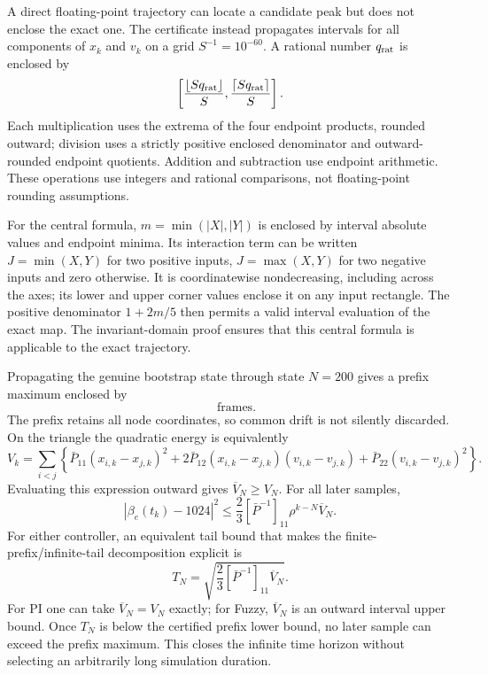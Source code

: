 A direct floating-point trajectory can locate a candidate peak but does
not enclose the exact one. The certificate instead propagates intervals
for all components of $x_k$ and $v_k$ on a grid $S^{-1}=10^{-60}$.
A rational number $q_{\rm rat}$ is enclosed by
\[
 \left[\frac{\lfloor Sq_{\rm rat}\rfloor}{S},\frac{\lceil Sq_{\rm rat}\rceil}{S}\right].
\]
Each multiplication uses the extrema of the four endpoint products,
rounded outward; division uses a strictly positive enclosed denominator
and outward-rounded endpoint quotients. Addition and subtraction use
endpoint arithmetic. These operations use integers and rational comparisons,
not floating-point rounding assumptions.

For the central formula, $m=\min(|X|,|Y|)$ is enclosed by interval
absolute values and endpoint minima. Its interaction term can be written
$J=\min(X,Y)$ for two positive inputs, $J=\max(X,Y)$ for two negative
inputs and zero otherwise. It is coordinatewise nondecreasing, including
across the axes; its lower and upper corner values enclose it on any
input rectangle. The positive denominator $1+2m/5$ then permits a valid
interval evaluation of the exact map. The invariant-domain proof ensures
that this central formula is applicable to the exact trajectory.

Propagating the genuine bootstrap state through state $N=200$ gives a
prefix maximum enclosed by
\begin{equation}
 [17.314056817962,\;17.314056817963]\quad\text{frames}.
 \label{eq:btd_d_fuzzy_prefix}
\end{equation}
The prefix retains all node coordinates, so common drift is not silently
discarded. On the triangle the quadratic energy is equivalently
\begin{equation}
 V_k=\sum_{i<j}\left\{
 \bar P_{11}(x_{i,k}-x_{j,k})^2+
 2\bar P_{12}(x_{i,k}-x_{j,k})(v_{i,k}-v_{j,k})+
 \bar P_{22}(v_{i,k}-v_{j,k})^2\right\}.
 \label{eq:btd_d_pair_energy}
\end{equation}
Evaluating this expression outward gives $\overline V_N\ge V_N$.
For all later samples,
\begin{equation}
 |\beta_e(t_k)-1024|^2
 \le\frac23[\bar P^{-1}]_{11}\rho^{k-N}\overline V_N.
 \label{eq:btd_d_fuzzy_tail}
\end{equation}
For either controller, an equivalent tail bound that makes the
finite-prefix/infinite-tail decomposition explicit is
\begin{equation}
 T_N=\sqrt{\frac23[\bar P^{-1}]_{11}\overline V_N}.
 \label{eq:btd_tail}
\end{equation}
For PI one can take $\overline V_N=V_N$ exactly; for Fuzzy,
$\overline V_N$ is an outward interval upper bound. Once $T_N$ is below
the certified prefix lower bound, no later sample can exceed the prefix
maximum. This closes the infinite time horizon without selecting an
arbitrarily long simulation duration.

